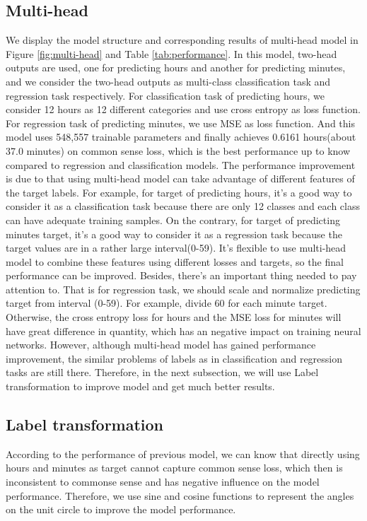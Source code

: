 \documentclass{article}
\begin{document}
\subsection{Multi-head}
We display the model structure and corresponding results of multi-head model in Figure \ref{fig:multi-head} and Table \ref{tab:performance}. In this model, two-head outputs are used, one for predicting hours and another for predicting minutes, and we consider the two-head outputs as multi-class classification task and regression task respectively. For classification task of predicting hours, we consider 12 hours as 12 different categories and use cross entropy as loss function. For regression task of predicting minutes, we use MSE as loss function. And this model uses 548,557 trainable parameters and finally achieves 0.6161 hours(about 37.0 minutes) on common sense loss, which is the best performance up to know compared to regression and classification models. The performance improvement is due to that using multi-head model can take advantage of different features of the target labels. For example, for target of predicting hours, it's a good way to consider it as a classification task because there are only 12 classes and each class can have adequate training samples. On the contrary, for target of predicting minutes target, it's a good way to consider it as a regression task because the target values are in a rather large interval(0-59). It's flexible to use multi-head model to combine these features using different losses and targets, so the final performance can be improved. Besides, there's an important thing needed to pay attention to. That is for regression task, we should scale and normalize predicting target from interval (0-59). For example, divide 60 for each minute target. Otherwise, the cross entropy loss for hours and the MSE loss for minutes will have great difference in quantity, which has an negative impact on training neural networks. However, although multi-head model has gained performance improvement, the similar problems of labels as in classification and regression tasks are still there. Therefore, in the next subsection, we will use Label transformation to improve model and get much better results.


\subsection{Label transformation}
According to the performance of previous model, we can know that directly using hours and minutes as target cannot capture common sense loss, which then is inconsistent to commonse sense and has negative influence on the model performance. Therefore, we use sine and cosine functions to represent the angles on the unit circle to improve the model performance.
\end{document}

